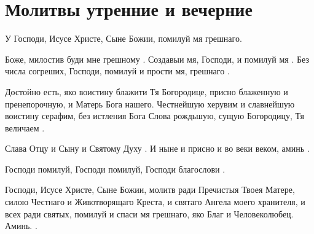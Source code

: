 

\label{_content_edinovercheskie-molitvi}






\section{Молитвы утренние и вечерние}\begin{mymulticols}



\lettrine{У}{} Господи, Исусе Христе, Сыне Божии, помилуй мя грешнаго.




Боже, милостив буди мне грешному . Создавыи мя, Господи, и помилуй мя . Без числа согреших, Господи, помилуй и прости мя, грешнаго .


Достойно есть, яко воистину блажити Тя Богородице, присно блаженную и пренепорочную, и Матерь Бога нашего. Честнейшую херувим и славнейшую воистину серафим, без истления Бога Слова рождьшую, сущую Богородицу, Тя величаем .


Слава Отцу и Сыну и Святому Духу . И ныне и присно и во веки веком, аминь .


Господи помилуй, Господи помилуй, Господи благослови . 


Господи, Исусе Христе, Сыне Божии, молитв ради Пречистыя Твоея Матере, силою Честнаго и Животворящаго Креста, и святаго Ангела моего хранителя, и всех ради святых, помилуй и спаси мя грешнаго, яко Благ и Человеколюбец. Аминь. .





\end{mymulticols}
